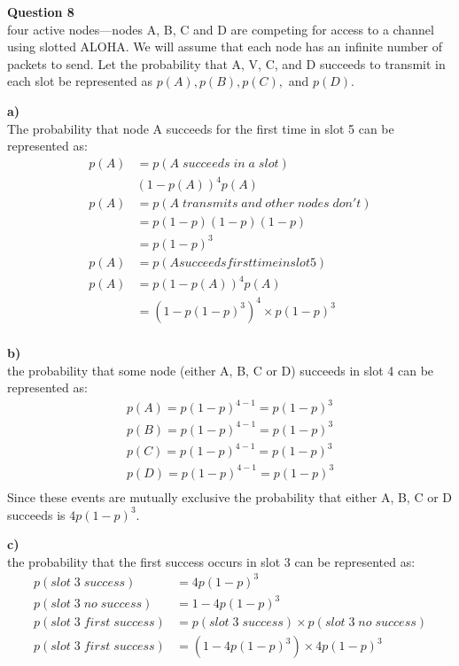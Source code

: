 \documentclass{article}
\begin{document}
{\bf Question 8}\\
four active nodes—nodes A, B, C and D are competing for access to a channel using slotted ALOHA. We will assume that each node has an infinite number of packets to send. Let the probability that A, V, C, and D succeeds to transmit in each slot be represented as $p(A), p(B), p(C),$ and $p(D)$.

{\bf a)}\\
The probability that node A succeeds for the first time in slot 5 can be represented as:\\
\begin{equation*}
\begin{split}
    p(A) &= p(A \; succeeds \; in \; a \; slot)\\
    & (1-p(A))^4 p(A)\\
    p(A) &= p(A \; transmits \; and \; other \; nodes \; don't)\\
    &= p(1-p)(1-p)(1-p)\\
    &= p(1-p)^3\\
    p(A) &= p(A succeeds first time in slot 5)\\ 
    p(A) &= p(1-p(A))^4p(A)\\
    &= (1-p(1-p)^3)^4 \times p(1-p)^3\\
\end{split}
\end{equation*} 

\smallskip
{\bf b)}\\
the probability that some node (either A, B, C or D) succeeds in slot 4 can be represented as:
\begin{equation*}
\begin{split}
    p(A) = p(1-p)^{4-1}=p(1-p)^3\\
    p(B) = p(1-p)^{4-1}=p(1-p)^3\\
    p(C) = p(1-p)^{4-1}=p(1-p)^3\\
    p(D) = p(1-p)^{4-1}=p(1-p)^3\\
\end{split}
\end{equation*} 
Since these events are mutually exclusive the probability that either A, B, C or D succeeds is $4p(1-p)^3$.

\smallskip
{\bf c)}\\
the probability that the first success occurs in slot 3 can be represented as:
\begin{equation*}
\begin{split}
    p(slot \; 3 \; success) &= 4p(1-p)^3\\
    p(slot \; 3 \; no \; success) &= 1-4p(1-p)^3\\
    p(slot \; 3 \; first \; success) &= p(slot \; 3 \; success) \times p(slot \; 3 \; no \; success)\\
    p(slot \; 3 \; first \; success) &= (1-4p(1-p)^3) \times 4p(1-p)^3
\end{split}
\end{equation*} 
\end{document}
